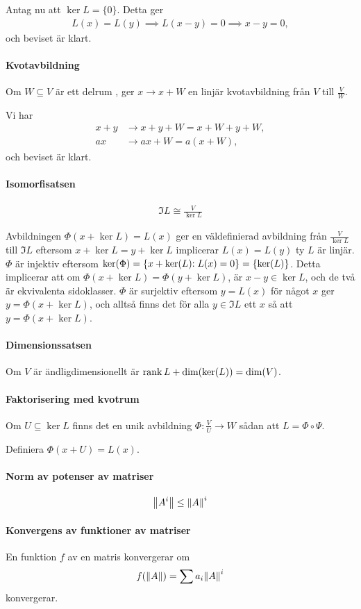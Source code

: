 Antag nu att $\ker{L} = \{0\}$. Detta ger
\begin{align*}
	L(x) = L(y) \implies L(x - y) = 0 \implies x - y = 0,
\end{align*}
och beviset är klart.

\paragraph{Kvotavbildning}
Om $W\subseteq V$ är ett delrum , ger $x\to x + W$ en linjär kvotavbildning från $V$ till $\frac{V}{W}$.

\proof
Vi har
\begin{align*}
	x + y &\to x + y + W = x + W + y + W, \\
	ax    &\to ax + W = a(x + W),
\end{align*}
och beviset är klart.

\paragraph{Isomorfisatsen}
\begin{align*}
	\Im{L} \cong \frac{V}{\ker{L}}
\end{align*}

\proof
Avbildningen $\Phi(x + \ker{L}) = L(x)$ ger en väldefinierad avbildning från $\frac{V}{\ker{L}}$ till $\Im{L}$ eftersom $x + \ker{L} = y + \ker{L}$ implicerar $L(x) = L(y)$ ty $L$ är linjär. $\Phi$ är injektiv eftersom $\ker{\Phi} = \set{x + \ker{L}}{L(x) = 0} = \set{\ker{L}}{}$. Detta implicerar att om $\Phi(x + \ker{L}) = \Phi(y + \ker{L})$, är $x - y\in\ker{L}$, och de två är ekvivalenta sidoklasser. $\Phi$ är surjektiv eftersom $y = L(x)$ för något $x$ ger $y = \Phi(x + \ker{L})$, och alltså finns det för alla $y\in\Im{L}$ ett $x$ så att $y = \Phi(x + \ker{L})$.

\paragraph{Dimensionssatsen}
Om $V$ är ändligdimensionellt är $\rank{L} + \text{dim}(\text{ker}(L)) = \text{dim}(V)$.

\proof

\paragraph{Faktorisering med kvotrum}
Om $U\subseteq\ker{L}$ finns det en unik avbildning $\Phi: \frac{V}{U}\to W$ sådan att $L = \Phi\circ\Psi$.

\proof
Definiera $\Phi(x + U) = L(x)$.

\paragraph{Norm av potenser av matriser}
\begin{align*}
	\norm{A^{i}}\leq \norm{A}^{i}
\end{align*}

\proof

\paragraph{Konvergens av funktioner av matriser}
En funktion $f$ av en matris konvergerar om
\begin{align*}
	f(\norm{A}) = \sum a_{i}\norm{A}^{i}
\end{align*}
konvergerar.